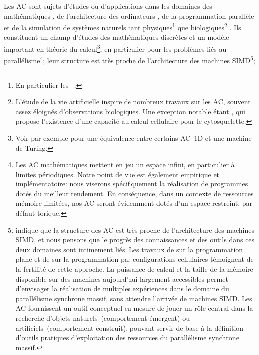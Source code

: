 Les AC sont sujets d'\'etudes ou d'applications dans les domaines des
math\'ematiques %
\cite[]{Jen90,Vichniac90}, %
de l'architecture des ordinateurs %
\cite[]{Legendi87a,Zsoter87}, %
de la programmation parall\`ele %
\cite[]{Preston84,Almasi87} %
et de la simulation de syst\`emes naturels %
tant physiques\footnote{%
  En particulier les ~\cite[]{Despain90,Margolus90}.} %
\cite[]{Margolus84,Toffoli84,Rossi93} %
que biologiques\footnote{%
  L'\'etude de la vie artificielle inspire de nombreux travaux sur les
  AC, souvent assez \'eloign\'es d'observations biologiques. %
  Une exception notable \'etant \cite{Hameroff89}, qui propose
  l'existence d'une capacit\'e au calcul cellulaire pour le
  cytosquelette.} %
\cite[]{Tamayo89,Boer93}. %
Ils constituent un champ d'\'etudes des math\'ematiques discr\`etes et un
mod\`ele important en th\'eorie du calcul\footnote{%
  Voir par exemple \cite{Lindgren90} pour une \'equivalence
  entre certains AC~1D et une machine de Turing.}, %
en particulier pour les probl\`emes li\'es au parall\'elisme\footnote{%
  Les AC math\'ematiques mettent en jeu
  un espace infini, en particulier \`a limites p\'eriodiques. %
  Notre point de vue est \'egalement empirique et
  impl\'ementatoire: nous viserons sp\'ecifiquement la r\'ealisation de
  programmes dot\'es du meilleur rendement. %
  En cons\'equence, dans un contexte de ressources m\'emoire limit\'ees, nos
  AC seront \'evidemment dot\'es d'un espace restreint, par d\'efaut torique.}; %
leur structure est tr\`es proche de l'architecture des machines
SIMD\footnote{%
  \cite{Greussay85} indique que la structure des AC est tr\`es proche de
  l'architecture des machines SIMD, et nous pensons que le progr\`es des
  connaissances et des outils dans ces deux domaines sont intimement
  li\'es. %
  Les travaux de \cite{Rozin87,Rozin88,Rozin93} sur la programmation
  plane et de \cite{Signorini92,signorini94} sur la programmation par
  configurations cellulaires t\'emoignent de la fertilit\'e de cette
  approche. %
  La puissance de calcul et la taille de la m\'emoire disponible sur des
  machines aujourd'hui largement accessibles permet d'envisager la
  r\'ealisation de multiples exp\'eriences dans le domaine du parall\'elisme
  synchrone massif, sans attendre l'arriv\'ee de machines SIMD\@. %
  Les AC fournissent un outil conceptuel en mesure de jouer un r\^ole
  central dans la recherche d'objets naturels~(comportement \'emergent)
  ou artificiels~(comportement construit), pouvant servir de base \`a la
  d\'efinition d'outils pratiques d'exploitation des ressources du
  parall\'elisme synchrone massif.}; %
